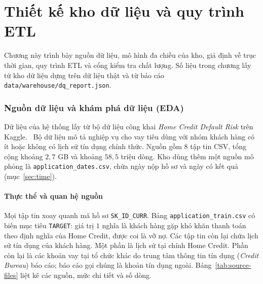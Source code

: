 \part{Thiết kế kho dữ liệu và quy trình ETL}
\label{part:ch2}
\begingroup
\sloppy

Chương này trình bày nguồn dữ liệu, mô hình đa chiều của kho, giả định về trục thời gian, quy trình ETL và cổng kiểm tra chất lượng. Số liệu trong chương lấy từ kho dữ liệu dựng trên dữ liệu thật và từ báo cáo \texttt{data/warehouse/dq\_report.json}.

\section{Nguồn dữ liệu và khám phá dữ liệu (EDA)}
\label{sec:source-eda}
Dữ liệu của hệ thống lấy từ bộ dữ liệu công khai \textit{Home Credit Default Risk} trên Kaggle.~\cite{homecredit2018} Bộ dữ liệu mô tả nghiệp vụ cho vay tiêu dùng với nhóm khách hàng có ít hoặc không có lịch sử tín dụng chính thức. Nguồn gồm $8$ tập tin CSV, tổng cộng khoảng $2{,}7$ GB và khoảng $58{,}5$ triệu dòng. Kho dùng thêm một nguồn mô phỏng là \texttt{application\_dates.csv}, chứa ngày nộp hồ sơ và ngày có kết quả (mục~\ref{sec:time}).

\subsection{Thực thể và quan hệ nguồn}
Mọi tập tin xoay quanh mã hồ sơ \texttt{SK\_ID\_CURR}. Bảng \texttt{application\_train.csv} có biến mục tiêu \texttt{TARGET}: giá trị $1$ nghĩa là khách hàng gặp khó khăn thanh toán theo định nghĩa của Home Credit, được coi là vỡ nợ. Các tập tin còn lại chứa lịch sử tín dụng của khách hàng. Một phần là lịch sử tại chính Home Credit. Phần còn lại là các khoản vay tại tổ chức khác do trung tâm thông tin tín dụng (\textit{Credit Bureau}) báo cáo; báo cáo gọi chúng là khoản tín dụng ngoài. Bảng~\ref{tab:source-files} liệt kê các nguồn, mức chi tiết và số dòng.

